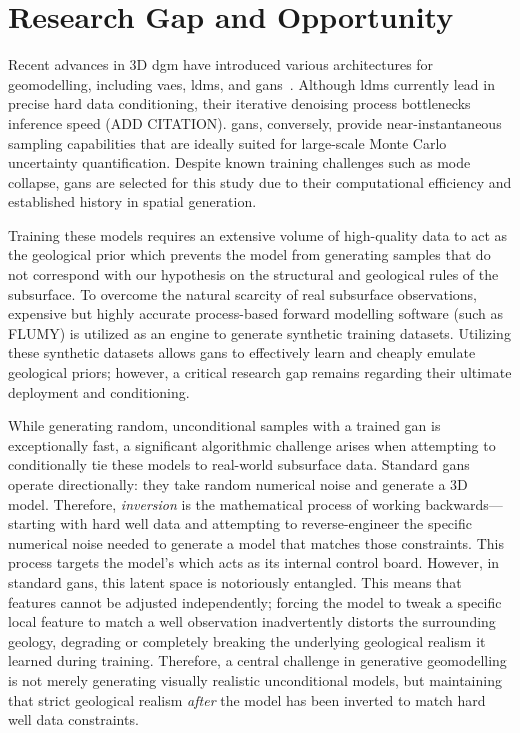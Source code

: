 \section{Research Gap and Opportunity}
Recent advances in 3D \gls{dgm} have introduced various architectures for geomodelling, including \glspl{vae}, \glspl{ldm}, and \glspl{gan}~\parencite[e.g.,][]{laloy2017inversion, bhavsar2024stable, song2023gansim, federico2025three}. Although \glspl{ldm} currently lead in precise hard data conditioning, their iterative denoising process bottlenecks inference speed (ADD CITATION). \glspl{gan}, conversely, provide near-instantaneous sampling capabilities that are ideally suited for large-scale Monte Carlo uncertainty quantification. Despite known training challenges such as mode collapse, \glspl{gan} are selected for this study due to their computational efficiency and established history in spatial generation.

Training these models requires an extensive volume of high-quality data to act as the geological prior which prevents the model from generating samples that do not correspond with our hypothesis on the structural and geological rules of the subsurface. To overcome the natural scarcity of real subsurface observations, expensive but highly accurate process-based forward modelling software (such as FLUMY) is utilized as an engine to generate synthetic training datasets. Utilizing these synthetic datasets allows \glspl{gan} to effectively learn and cheaply emulate geological priors; however, a critical research gap remains regarding their ultimate deployment and conditioning.

While generating random, unconditional samples with a trained \gls{gan} is exceptionally fast, a significant algorithmic challenge arises when attempting to conditionally tie these models to real-world subsurface data. Standard \glspl{gan} operate directionally: they take random numerical noise and generate a 3D model. Therefore, \textit{inversion} is the mathematical process of working backwards—starting with hard well data and attempting to reverse-engineer the specific numerical noise needed to generate a model that matches those constraints. This process targets the model's  which acts as its internal control board. However, in standard \glspl{gan}, this latent space is notoriously entangled. This means that features cannot be adjusted independently; forcing the model to tweak a specific local feature to match a well observation inadvertently distorts the surrounding geology, degrading or completely breaking the underlying geological realism it learned during training. Therefore, a central challenge in generative geomodelling is not merely generating visually realistic unconditional models, but maintaining that strict geological realism \textit{after} the model has been inverted to match hard well data constraints.

